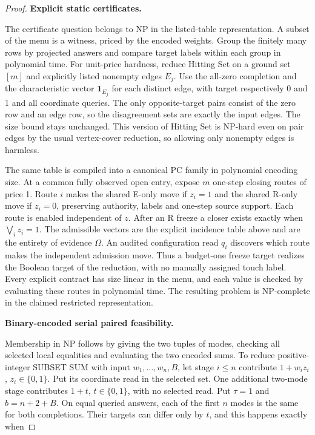 \begin{proof}

\textbf{Explicit static certificates.}

The certificate question belongs to NP in the listed-table representation. A subset of the menu is a witness, priced by the encoded weights. Group the finitely many rows by projected answers and compare target labels within each group in polynomial time. For unit-price hardness, reduce Hitting Set on a ground set \([m]\) and explicitly listed nonempty edges \(E_j\). Use the all-zero completion and the characteristic vector \(\mathbf 1_{E_j}\) for each distinct edge, with target respectively 0 and 1 and all coordinate queries. The only opposite-target pairs consist of the zero row and an edge row, so the disagreement sets are exactly the input edges. The size bound stays unchanged. This version of Hitting Set is NP-hard even on pair edges by the usual vertex-cover reduction, so allowing only nonempty edges is harmless.

The same table is compiled into a canonical PC family in polynomial encoding size. At a common fully observed open entry, expose \(m\) one-step closing routes of price 1. Route \(i\) makes the shared E-only move if \(z_i=1\) and the shared R-only move if \(z_i=0\), preserving authority, labels and one-step source support. Each route is enabled independent of \(z\). After an R freeze a closer exists exactly when \(\bigvee_i z_i=1\). The admissible vectors are the explicit incidence table above and are the entirety of evidence \(\Omega\). An audited configuration read \(q_i\) discovers which route makes the independent admission move. Thus a budget-one freeze target realizes the Boolean target of the reduction, with no manually assigned touch label. Every explicit contract has size linear in the menu, and each value is checked by evaluating these routes in polynomial time. The resulting problem is NP-complete in the claimed restricted representation.

\textbf{Binary-encoded serial paired feasibility.}

Membership in NP follows by giving the two tuples of modes, checking all selected local equalities and evaluating the two encoded sums. To reduce positive-integer SUBSET SUM with input \(w_1,\ldots,w_n,B\), let stage \(i\le n\) contribute \(1+w_i z_i\), \(z_i\in\{0,1\}\). Put its coordinate read in the selected set. One additional two-mode stage contributes \(1+t\), \(t\in\{0,1\}\), with no selected read. Put \(\tau=1\) and \(b=n+2+B\). On equal queried answers, each of the first \(n\) modes is the same for both completions. Their targets can differ only by \(t\), and this happens exactly when


\end{proof}
